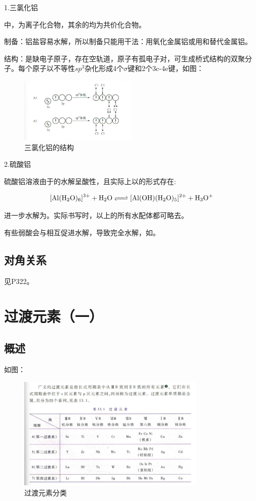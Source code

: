 \documentclass[a4paper,UTF8]{article}
\begin{document}
1.三氯化铝

中，为离子化合物，其余的均为共价化合物。

制备：铝盐容易水解，所以制备只能用干法：用氧化金属铝或用和替代金属铝。

结构：是缺电子原子，存在空轨道，原子有孤电子对，可生成桥式结构的双聚分子。每个原子以不等性$sp^3$杂化形成4个$\sigma$键和2个3c-4e键，如图：

\begin{figure}[htpb]
	\centering
	\includegraphics[width=0.5\textwidth]{figure//AlCl3的结构.png}
	\caption{三氯化铝的结构}
	\label{fig:}
\end{figure}

2.硫酸铝

硫酸铝溶液由于的水解呈酸性，且实际上以的形式存在:

$$ \ce{[Al(H2O)6]^3+ + H2O <=> [Al(OH)(H2O)5]^2+ + H3O+} $$

进一步水解为。实际书写时，以上的所有水配体都可略去。

有些弱酸会与相互促进水解，导致完全水解，如。

\subsection{对角关系}

见P322。

\section{过渡元素（一）}

\subsection{概述}

如图：

\begin{figure}[htpb]
	\centering
	\includegraphics[width=0.8\textwidth]{figure//过渡元素.png}
	\caption{过渡元素分类}
	\label{fig:}
\end{figure}
\end{document}

